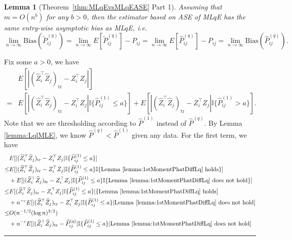 \documentclass[a4paper]{article}
\newenvironment{proof}{{\bf Proof:  }}{\hfill\rule{2mm}{2mm}}
\newtheorem{lemma}[fact]{Lemma}
\renewcommand{\hat}{\widehat}
\begin{document}
\begin{lemma}[Theorem~\ref{thm:MLqEvsMLqEASE} Part 1]
\label{lm:LqConsistentproof}
Assuming that $m = O(n^b)$ for any $b > 0$, then the estimator based on ASE of ML$q$E has the same entry-wise asymptotic bias as ML$q$E, i.e.\ 
\[
	\lim_{n \to \infty} \mathrm{Bias}(\widetilde{P}_{ij}^{(q)}) = \lim_{n \to \infty} E[\widetilde{P}_{ij}^{(q)}] - P_{ij} = \lim_{n \to \infty} E[\hat{P}^{(q)}_{ij}] - P_{ij}
    = \lim_{n \to \infty} \mathrm{Bias}(\hat{P}_{ij}^{(q)}).
\]
\end{lemma}
\begin{proof}
Fix some $a > 0$, we have
\begin{align*}
	& E[|(\hat{Z}_i^{\top} \hat{Z}_j)_{\mathrm{tr}} - Z_i^{\top} Z_j|] \\
	= & E[|(\hat{Z}_i^{\top} \hat{Z}_j)_{\mathrm{tr}} - Z_i^{\top} Z_j| \mathbb{I}\{\hat{P}^{(1)}_{ij} \le a\}]
	+ E[|(\hat{Z}_i^{\top} \hat{Z}_j)_{\mathrm{tr}} - Z_i^{\top} Z_j| \mathbb{I}\{\hat{P}^{(1)}_{ij} > a\}].
\end{align*}
Note that we are thresholding according to $\hat{P}^{(1)}$ instead of $\hat{P}^{(q)}$. By Lemma \ref{lemma:LqlMLE}, we know $\hat{P}^{(q)} < \hat{P}^{(1)}$ given any data.
For the first term, we have
\begin{align*}
	& E[|(\hat{Z}_i^{\top} \hat{Z}_j)_{\mathrm{tr}} - Z_i^{\top} Z_j| \mathbb{I}\{\hat{P}^{(1)}_{ij} \le a\}] \\
	\le & E[|(\hat{Z}_i^{\top} \hat{Z}_j)_{\mathrm{tr}} - Z_i^{\top} Z_j| \mathbb{I}\{\hat{P}^{(1)}_{ij} \le a\} \mathbb{I}\{\mathrm{Lemma\ } \ref{lemma:1stMomentPhatDiffLq} \mathrm{\ holds}\}] \\
	& + E[|(\hat{Z}_i^{\top} \hat{Z}_j)_{\mathrm{tr}} - Z_i^{\top} Z_j| \mathbb{I}\{\hat{P}^{(1)}_{ij} \le a\} \mathbb{I}\{\mathrm{Lemma\ } \ref{lemma:1stMomentPhatDiffLq} \mathrm{\ does\ not\ hold}\}] \\
	\le & E[(\hat{Z}_i^{\top} \hat{Z}_j)_{\mathrm{tr}} - Z_i^{\top} Z_j| \mathbb{I}\{\hat{P}^{(1)}_{ij} \le a\} |\{\mathrm{Lemma\ } \ref{lemma:1stMomentPhatDiffLq} \mathrm{\ holds}] \\
	& + n^{-c} E[|(\hat{Z}_i^{\top} \hat{Z}_j)_{\mathrm{tr}} - Z_i^{\top} Z_j| \mathbb{I}\{\hat{P}^{(1)}_{ij} \le a\} | \mathrm{Lemma\ } \ref{lemma:1stMomentPhatDiffLq} \mathrm{\ does\ not\ hold}] \\
	\le & O(n^{-1/2} (\log n)^{3/2}) \\
	& + n^{-c} E[|(\hat{Z}_i^{\top} \hat{Z}_j)_{\mathrm{tr}} - \hat{P}^{(q)}_{ij}| \mathbb{I}\{\hat{P}^{(1)}_{ij} \le a\} | \mathrm{Lemma\ } \ref{lemma:1stMomentPhatDiffLq} \mathrm{\ does\ not\ hold}] \\

\end{align*}
\end{proof}
\end{document}
